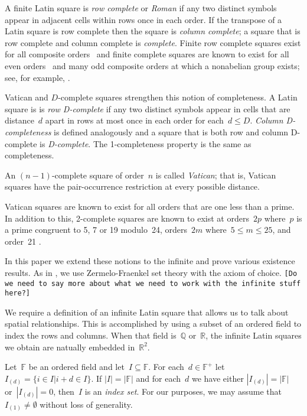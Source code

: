 \documentclass[12pt,a4paper]{article}
\newcommand{\R}{\mathbb{R}}
\newcommand{\Q}{\mathbb{Q}}
\newcommand{\F}{\mathbb{F}}
\begin{document}
A finite Latin square is {\em row complete} or {\em Roman} if  any two distinct symbols appear in adjacent cells within rows once in each order.  If the transpose of a Latin square is row complete then the square is {\em column complete}; a square that is row complete and column complete is {\em complete}.  Finite row complete squares exist for all composite orders~\cite{Higham98} and finite complete squares are known to exist for all even orders~\cite{Gordon61} and many odd composite orders at which a nonabelian group exists; see, for example, \cite{Ollis14}.

Vatican and $D$-complete  squares strengthen this notion of completeness. 
A Latin square is is {\em row D-complete} if any two distinct symbols appear in cells that are distance~$d$ apart in rows at most once in each order for each~$d \leq D$. {\em Column D-completeness} is defined analogously and a square that is both row and column D-complete is {\em D-complete}.  The 1-completeness property is the same as completeness.

An $(n-1)$-complete square of order~$n$ is called {\em Vatican}; that is, Vatican squares have the pair-occurrence restriction at every possible distance.

Vatican squares are known to exist for all orders that are one less than a prime.  In addition to this, 2-complete squares are known to exist at orders~$2p$ where~$p$ is a prime congruent to 5, 7 or 19 modulo~24, orders~$2m$ where~$5 \leq m \leq 25$, and order~21 \cite{TuscanCRC,OllisTFSG}.


In this paper we extend these notions to the infinite and prove various existence results.  As in \cite{CW02}, we use Zermelo-Fraenkel set theory with the axiom of choice.  \texttt{[Do we need to say more about what we need to work with the infinite stuff here?]}

We require a definition of an infinite Latin square that allows us to talk about spatial relationships.  This is accomplished by using a subset of an ordered field to index the rows and columns.  When that field is~$\Q$ or~$\R$, the infinite Latin squares we obtain are natually embedded in~$\R^2$.

Let~$\F$ be an ordered field and let~$I \subseteq \F$.   For each~$d \in \F^+$ let~$I_{(d)} = \{ i \in I | i+d \in I \}$.  If $|I| = |\F|$ and for each~$d$ we have either $|I_{(d)}| = |\F|$ or~$|I_{(d)}| = 0$, then~$I$ is an {\em index set}.   For our purposes, we may assume that~$I_{(1)} \neq \emptyset$ without loss of generality.
\end{document}

